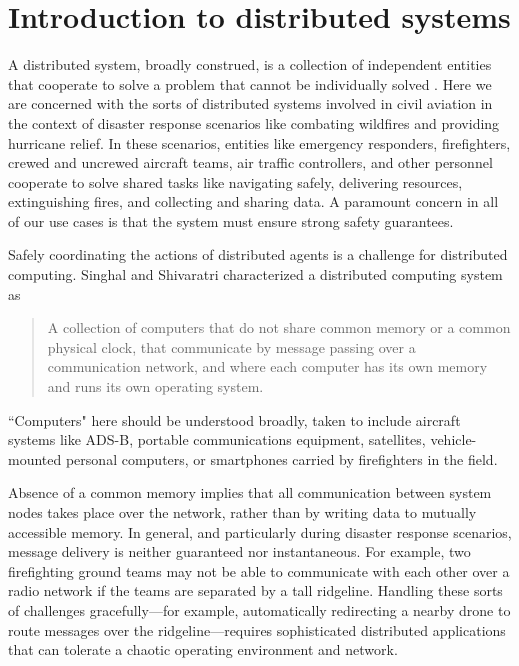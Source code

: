 \section{Introduction to distributed systems}
\label{sec:distrsys}

A distributed system, broadly construed, is a collection of
independent entities that cooperate to solve a problem that cannot be
individually solved \cite{kshemkalyani_singhal_2008}. Here we are
concerned with the sorts of distributed systems involved in civil
aviation in the context of disaster response scenarios like combating
wildfires and providing hurricane relief. In these scenarios, entities
like emergency responders, firefighters, crewed and uncrewed aircraft
teams, air traffic controllers, and other personnel cooperate to solve
shared tasks like navigating safely, delivering resources,
extinguishing fires, and collecting and sharing data. A paramount
concern in all of our use cases is that the system must ensure strong
safety guarantees.

Safely coordinating the actions of distributed agents is a challenge
for distributed computing. Singhal and Shivaratri
\cite{10.5555/562065} characterized a distributed computing system as
\begin{quotation}
  A collection of computers that do not share common memory or a
  common physical clock, that communicate by message passing over a
  communication network, and where each computer has its own memory
  and runs its own operating system.
\end{quotation}
``Computers" here should be understood broadly, taken to include
aircraft systems like ADS-B, portable communications equipment,
satellites, vehicle-mounted personal computers, or smartphones carried
by firefighters in the field.

Absence of a common memory implies that all communication between
system nodes takes place over the network, rather than by writing data
to mutually accessible memory. In general, and particularly during
disaster response scenarios, message delivery is neither guaranteed
nor instantaneous. For example, two firefighting ground teams may not
be able to communicate with each other over a radio network if the
teams are separated by a tall ridgeline. Handling these sorts of
challenges gracefully---for example, automatically redirecting a
nearby drone to route messages over the ridgeline---requires
sophisticated distributed applications that can tolerate a chaotic
operating environment and network.

